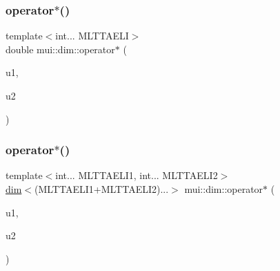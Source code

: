 \mbox{\label{namespacemui_1_1dim_afe1659ab39b97dfe04e07194509491f9}} 
\subsubsection{\texorpdfstring{operator$\ast$()}{operator*()}\hspace{0.1cm}{\footnotesize\ttfamily [1/4]}}
{\footnotesize\ttfamily template$<$int... M\+L\+T\+T\+A\+E\+LI$>$ \\
double mui\+::dim\+::operator$\ast$ (\begin{DoxyParamCaption}\item[{const \hyperlink{structmui_1_1dim_1_1dim}{dim}$<$ M\+L\+T\+T\+A\+E\+L\+I... $>$ \&}]{u1,  }\item[{const \hyperlink{structmui_1_1dim_1_1dim}{dim}$<$-\/M\+L\+T\+T\+A\+E\+L\+I... $>$ \&}]{u2 }\end{DoxyParamCaption})\hspace{0.3cm}{\ttfamily [inline]}}

\mbox{\label{namespacemui_1_1dim_af8ca5334a6198409c37afe90e460163f}} 
\subsubsection{\texorpdfstring{operator$\ast$()}{operator*()}\hspace{0.1cm}{\footnotesize\ttfamily [2/4]}}
{\footnotesize\ttfamily template$<$int... M\+L\+T\+T\+A\+E\+L\+I1, int... M\+L\+T\+T\+A\+E\+L\+I2$>$ \\
\hyperlink{structmui_1_1dim_1_1dim}{dim}$<$(M\+L\+T\+T\+A\+E\+L\+I1+M\+L\+T\+T\+A\+E\+L\+I2)...$>$ mui\+::dim\+::operator$\ast$ (\begin{DoxyParamCaption}\item[{const \hyperlink{structmui_1_1dim_1_1dim}{dim}$<$ M\+L\+T\+T\+A\+E\+L\+I1... $>$ \&}]{u1,  }\item[{const \hyperlink{structmui_1_1dim_1_1dim}{dim}$<$ M\+L\+T\+T\+A\+E\+L\+I2... $>$ \&}]{u2 }\end{DoxyParamCaption})\hspace{0.3cm}{\ttfamily [inline]}}

